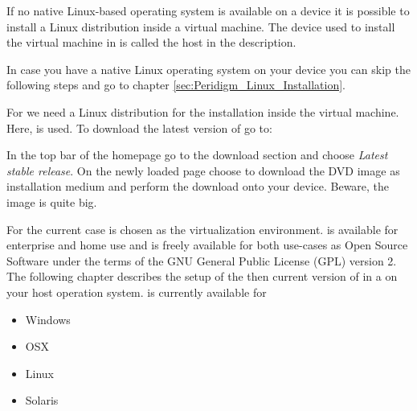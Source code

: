 % 
%               
%          
% 

If no native Linux-based operating system is available on a device it is possible to install a Linux distribution inside a virtual machine. The device used to install the virtual machine in is called the host in the description.

In case you have a native Linux operating system on your device you can skip the following steps and go to chapter \ref{sec:Peridigm_Linux_Installation}.

 \label{sec:VirtualBox_Download_Linux_Distribution}

For \marktool{\toolname} we need a Linux distribution for the installation inside the virtual machine. Here, \marktool{\opensusename} is used. To download the latest version of \marktool{\opensusename} go to:

\href{\opensuseaddress}{\opensuseaddress}

In the top bar of the homepage go to the download section and choose \textit{Latest stable release}. On the newly loaded page choose to download the DVD image as installation medium and perform the download onto your device. Beware, the image is quite big.



For the current case \marktool{\virtualboxname} is chosen as the virtualization environment. \marktool{\virtualboxname} is available for enterprise and home use and is freely available for both use-cases as Open Source Software under the terms of the GNU General Public License (GPL) version 2. The following chapter describes the setup of the then current version of \marktool{\opensusename} in a \marktool{\virtualboxname} on your host operation system. \marktool{\virtualboxname} is currently available for

\begin{itemize}[noitemsep, nolistsep, columns=4]
 \item Windows
 \item OSX
 \item Linux
 \item Solaris
\end{itemize}

